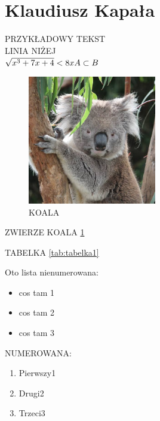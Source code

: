 \section{Klaudiusz Kapała}
PRZYKŁADOWY TEKST \\
LINIA NIŻEJ \\
\begin{math}
\sqrt{x^3+7x+4} < 8x \\
A \subset B
\end{math}

\begin{figure}[h]
    \centering
    \includegraphics[width=0.5\textwidth]{pictures/koala.jpg} %
    \caption{KOALA}
    \label{fig:koala}%
\end{figure}



ZWIERZE KOALA
\ref{fig:koala}%

TABELKA
\ref{tab:tabelka1}%


Oto lista nienumerowana:
\begin{itemize}
    \item cos tam 1
    \item cos tam 2
    \item cos tam 3
\end{itemize}

\vspace{1cm}



NUMEROWANA:
\begin{enumerate}
    \item Pierwszy1
    \item Drugi2
    \item Trzeci3
\end{enumerate}



